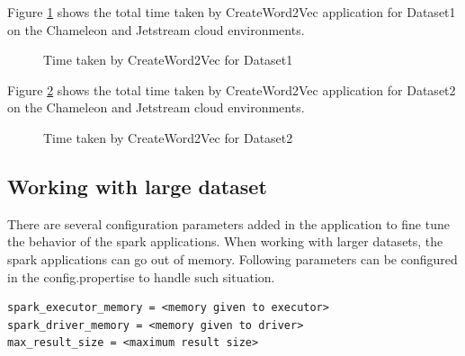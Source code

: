 Figure \ref{fig:compare147} shows the total time taken by CreateWord2Vec
application for Dataset1 on the Chameleon and Jetstream cloud environments.
\begin{figure}[htbp]
\centering
{}
\caption{Time taken by CreateWord2Vec for Dataset1}
\label{fig:compare147}
\end{figure}

Figure \ref{fig:compare522} shows the total time taken by CreateWord2Vec
application for Dataset2 on the Chameleon and Jetstream cloud environments.
\begin{figure}[htbp]
\centering
{}
\caption{Time taken by CreateWord2Vec for Dataset2}
\label{fig:compare522}
\end{figure}

\subsection{Working with large dataset} \label{benchmarklargedatasets}
There are several configuration parameters added in the application to
fine tune the behavior of the spark applications. When working with larger
datasets, the spark applications can go out of memory. Following parameters
can be configured in the config.propertise to handle such situation.

\begin{verbatim}
spark_executor_memory = <memory given to executor>
spark_driver_memory = <memory given to driver>
max_result_size = <maximum result size>
\end{verbatim}

